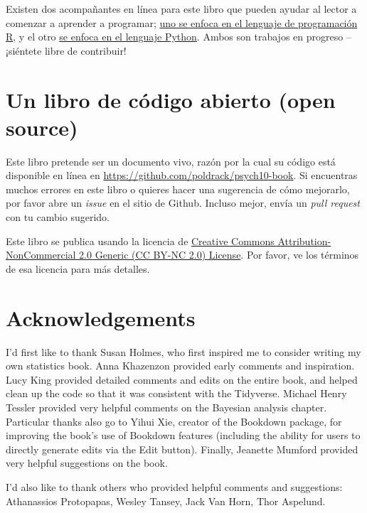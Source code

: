 \documentclass[
  12pt,
]{book}
\begin{document}
Existen dos acompañantes en línea para este libro que pueden ayudar al lector a comenzar a aprender a programar; \href{https://statsthinking21.github.io/statsthinking21-R-site/}{uno se enfoca en el lenguaje de programación R}, y el otro \href{https://statsthinking21.github.io/statsthinking21-python/}{se enfoca en el lenguaje Python}. Ambos son trabajos en progreso -- ¡siéntete libre de contribuir!

\hypertarget{un-libro-de-cuxf3digo-abierto-open-source}{%
\section{Un libro de código abierto (open source)}\label{un-libro-de-cuxf3digo-abierto-open-source}}

Este libro pretende ser un documento vivo, razón por la cual su código está disponible en línea en \url{https://github.com/poldrack/psych10-book}. Si encuentras muchos errores en este libro o quieres hacer una sugerencia de cómo mejorarlo, por favor abre un \emph{issue} en el sitio de Github. Incluso mejor, envía un \emph{pull request} con tu cambio sugerido.

Este libro se publica usando la licencia de \href{https://creativecommons.org/licenses/by-nc/2.0/}{Creative Commons Attribution-NonCommercial 2.0 Generic (CC BY-NC 2.0) License}. Por favor, ve los términos de esa licencia para más detalles.

\hypertarget{acknowledgements}{%
\section{Acknowledgements}\label{acknowledgements}}

I'd first like to thank Susan Holmes, who first inspired me to consider writing my own statistics book. Anna Khazenzon provided early comments and inspiration. Lucy King provided detailed comments and edits on the entire book, and helped clean up the code so that it was consistent with the Tidyverse. Michael Henry Tessler provided very helpful comments on the Bayesian analysis chapter. Particular thanks also go to Yihui Xie, creator of the Bookdown package, for improving the book's use of Bookdown features (including the ability for users to directly generate edits via the Edit button). Finally, Jeanette Mumford provided very helpful suggestions on the book.

I'd also like to thank others who provided helpful comments and suggestions: Athanassios Protopapas, Wesley Tansey, Jack Van Horn, Thor Aspelund.
\end{document}
